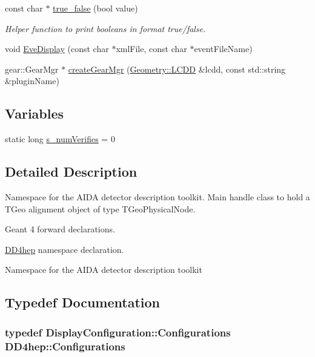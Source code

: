 \begin{DoxyCompactItemize}
const char $\ast$ \hyperlink{namespace_d_d4hep_a32a48a8889b636138d95a06c5818a858}{true\_\-false} (bool value)
\begin{DoxyCompactList}\small\item\em Helper function to print booleans in format true/false. \item\end{DoxyCompactList}\item 
void \hyperlink{namespace_d_d4hep_abf73c406aa34c4fe6bd8af3985bdd888}{EveDisplay} (const char $\ast$xmlFile, const char $\ast$eventFileName)
\item 
gear::GearMgr $\ast$ \hyperlink{namespace_d_d4hep_aeaa49904e5fff3d47fa8fd9600655f3e}{createGearMgr} (\hyperlink{class_d_d4hep_1_1_geometry_1_1_l_c_d_d}{Geometry::LCDD} \&lcdd, const std::string \&pluginName)
\end{DoxyCompactItemize}
\subsection*{Variables}
\begin{DoxyCompactItemize}
\item 
static long \hyperlink{namespace_d_d4hep_afc2f0d9d3dc77e8a9b1a06b7cd0404f0}{s\_\-numVerifies} = 0
\end{DoxyCompactItemize}


\subsection{Detailed Description}
Namespace for the AIDA detector description toolkit. Main handle class to hold a TGeo alignment object of type TGeoPhysicalNode.

Geant 4 forward declarations.

\hyperlink{namespace_d_d4hep}{DD4hep} namespace declaration.

Namespace for the AIDA detector description toolkit 

\subsection{Typedef Documentation}
\hypertarget{namespace_d_d4hep_a88b4bb8cba5bc194ed6da21bbb2e4787}{
\subsubsection[{Configurations}]{\setlength{\rightskip}{0pt plus 5cm}typedef {\bf DisplayConfiguration::Configurations} {\bf DD4hep::Configurations}}}
\label{namespace_d_d4hep_a88b4bb8cba5bc194ed6da21bbb2e4787}


